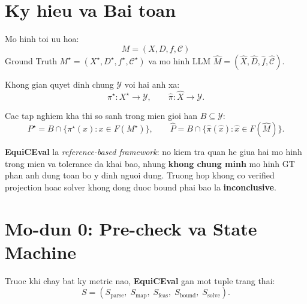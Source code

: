 \documentclass[11pt,a4paper]{article}
\newcommand{\method}{\textsf{\textbf{EquiCEval}}\xspace}
\begin{document}
\section{Ky hieu va Bai toan}

Mo hinh toi uu hoa:
\[
M = (X, D, f, \mathcal{C})
\]
Ground Truth $M^\star = (X^\star, D^\star, f^\star, \mathcal{C}^\star)$
va mo hinh LLM $\widehat{M} = (\widehat{X}, \widehat{D}, \widehat{f}, \widehat{\mathcal{C}})$.

Khong gian quyet dinh chung $\mathcal{Y}$ voi hai anh xa:
\[
\pi^\star : X^\star \to \mathcal{Y}, \qquad
\widehat{\pi} : \widehat{X} \to \mathcal{Y}.
\]

Cac tap nghiem kha thi so sanh trong mien gioi han $B \subseteq \mathcal{Y}$:
\[
P^\star = B \cap \{\pi^\star(x) : x \in F(M^\star)\},
\qquad
\widehat{P} = B \cap \{\widehat{\pi}(\hat{x}) : \hat{x} \in F(\widehat{M})\}.
\]

\begin{warningbox}
\method la \emph{reference-based framework}: no kiem tra quan he giua hai mo hinh
trong mien va tolerance da khai bao, nhung \textbf{khong chung minh} mo hinh GT
phan anh dung toan bo y dinh nguoi dung. Truong hop khong co verified projection
hoac solver khong dong duoc bound phai bao la \textbf{inconclusive}.
\end{warningbox}

\section{Mo-dun 0: Pre-check va State Machine}

Truoc khi chay bat ky metric nao, \method gan mot tuple trang thai:
\[
S = (S_{\mathrm{parse}},\; S_{\mathrm{map}},\; S_{\mathrm{feas}},\;
     S_{\mathrm{bound}},\; S_{\mathrm{solve}}).
\]
\end{document}
